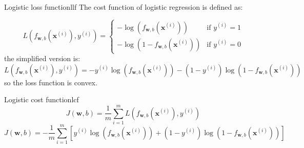 \begin{dfnbox}{Logistic loss function}{llf}
    The cost function of logistic regression is defined as:\par
    \[
    L(f_{\mathbf{w}, b}(\mathbf{x}^{(i)}), y^{(i)})=
    \begin{cases}
        -\log(f_{\mathbf{w}, b}(\mathbf{x}^{(i)})) & \text{if } y^{(i)} = 1\\
        -\log(1 - f_{\mathbf{w}, b}(\mathbf{x}^{(i)})) & \text{if } y^{(i)} = 0
    \end{cases}
    \]
    the simplified version is:
    \begin{equation}
        L(f_{\mathbf{w}, b}(\mathbf{x}^{(i)}), y^{(i)}) = -y^{(i)} \log(f_{\mathbf{w}, b}(\mathbf{x}^{(i)})) - (1 - y^{(i)}) \log(1 - f_{\mathbf{w}, b}(\mathbf{x}^{(i)}))
    \end{equation}
    so the loss function is convex.
\end{dfnbox}

\begin{dfnbox}{Logistic cost function}{lcf}
    \begin{equation}
        J(\mathbf{w}, b) = \frac{1}{m} \sum_{i=1}^{m} L(f_{\mathbf{w}, b}(\mathbf{x}^{(i)}), y^{(i)})
    \end{equation}
    \begin{equation}
        J(\mathbf{w}, b) = -\frac{1}{m} \sum_{i=1}^{m} \left[y^{(i)} \log\left(f_{\mathbf{w}, b}\left(\mathbf{x}^{(i)}\right)\right) + \left(1 - y^{(i)}\right) \log\left(1 - f_{\mathbf{w}, b}
        \left(\mathbf{x}^{(i)}\right)\right)\right]
    \end{equation}
\end{dfnbox}


